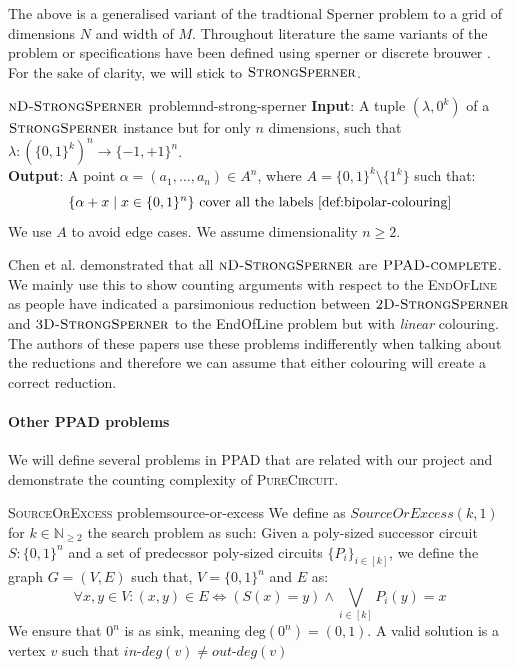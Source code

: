 The above is a generalised variant of the tradtional Sperner problem to
a grid of dimensions $N$ and width of $M$. 
Throughout literature the same variants of the problem or specifications
have been defined using sperner or discrete brouwer \cite{chen_SettlingComplexityComputing_2009, chen_Complexity2DDiscrete_2009, daskalakis_ComplexityComputingNash_2006, deligkas_PureCircuitTightInapproximability_2024}.
For the sake of clarity, we will stick to $\textsc{StrongSperner}$.

\begin{definitionbox}{$\textnormal{\textsc{nD-StrongSperner}}$ problem}{nd-strong-sperner}
    \textbf{Input}: A tuple $(\lambda,0^k)$ of a $\textnormal{\textsc{StrongSperner}}$ instance but for only $n$ dimensions, such that
    $\lambda : (\{0,1\}^k)^n \to \{-1, +1\}^n$.\\
    \textbf{Output}: A point $\alpha = (a_1, \hdots, a_n) \in A^n$, where $A=\{0,1\}^k \setminus \{1^k\}$ such that:
    $$
    \{\alpha + x \mid x \in \{0,1\}^n\} \text{ cover all the labels \ref{def:bipolar-colouring}}
    $$
    We use $A$ to avoid edge cases. We assume dimensionality $n \geq 2$.
\end{definitionbox}

Chen et al. \cite{chen_SettlingComplexityComputing_2009} demonstrated 
that all $\textsc{nD-StrongSperner}$ are $\textsc{PPAD-complete}$.
We mainly use this to show counting arguments with respect to the
\textsc{EndOfLine} as people have indicated a parsimonious reduction
between $\textsc{2D-StrongSperner}$ 
and $\textsc{3D-StrongSperner}$ to the EndOfLine problem but 
with \textit{linear} colouring. The authors of these papers
use these problems indifferently when talking about the reductions
and therefore we can assume that either colouring will create a correct reduction.

\paragraph{Other PPAD problems} 

We will define several problems in \textsc{PPAD} that are related with our project
and demonstrate the counting complexity of \textsc{PureCircuit}.

\begin{definitionbox}{\textsc{SourceOrExcess} problem}{source-or-excess}
    We define as $\textit{SourceOrExcess}(k,1)$ for $k \in \mathbb{N}_{\geq 2}$
    the search problem as such: Given a poly-sized successor circuit $S : \{0,1\}^n$
    and a set of predecssor poly-sized circuits $\{P_i\}_{i \in [k]}$, we define
    the graph $G = (V,E)$ such that, $V = \{0,1\}^n$ and $E$ as:
    $$
    \forall x, y \in V: (x,y) \in E \iff (S(x) = y) \wedge \bigvee_{i \in [k]} P_i(y) = x
    $$
    We ensure that $0^n$ is as sink, meaning $\text{deg}(0^n) = (0,1)$.
    A valid solution is a vertex $v$ such that $\textit{in-deg}(v) \neq \textit{out-deg}(v)$
\end{definitionbox}

